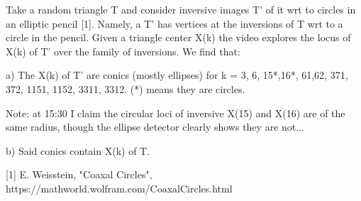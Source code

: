 Take a random triangle T and consider inversive images T' of it wrt to circles in an elliptic pencil [1]. Namely, a T' has vertices at the inversions of T wrt to a circle in the pencil. Given a triangle center X(k) the video explores the locus of X(k) of T' over the family of inversions. We find that:

a) The X(k) of T' are conics (mostly ellipses) for k = 3, 6, 15*,16*, 61,62, 371, 372, 1151, 1152, 3311, 3312. (*) means they are circles.

Note: at 15:30 I claim the circular loci of inversive X(15) and X(16) are of the same radius, though the ellipse detector clearly shows they are not...

b) Said conics contain X(k) of T.

[1] E. Weisstein, "Coaxal Circles", https://mathworld.wolfram.com/CoaxalCircles.html